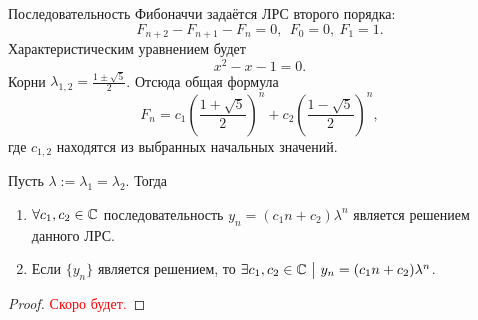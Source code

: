 \begin{enumerate}
	\begin{example}
		Последовательность Фибоначчи задаётся ЛРС второго порядка:
		\[
		F_{n + 2} - F_{n + 1} - F_n = 0,\ \ F_0 = 0,\ F_1 = 1.
		\]
		Характеристическим уравнением будет
		\[
		x^2 - x - 1 = 0.
		\]
		Корни $\lambda_{1, 2} = \frac{1 \pm \sqrt{5}}{2}$. Отсюда общая формула
		\[
		F_n = c_1\left(\frac{1 + \sqrt{5}}{2}\right)^n + c_2\left(\frac{1 - \sqrt{5}}{2}\right)^n,
		\]
		где $c_{1, 2}$ находятся из выбранных начальных значений.
	\end{example}

	\begin{theorem}
		Пусть $\lambda := \lambda_1 = \lambda_2$. Тогда
		\begin{enumerate}
			\item $\forall c_1, c_2 \in \mathbb{C}$ последовательность $y_n = (c_1n + c_2)\lambda^n$ является решением данного ЛРС.
			
			\item Если $\{y_n\}$ является решением, то $\exists c_1, c_2 \in \mathbb{C} \ \big|\  y_n = (c_1n + c_2)\lambda^n$.
		\end{enumerate}
	\end{theorem}
	
	\begin{proof}
		\textcolor{red}{Скоро будет.}
	\end{proof}
\end{enumerate}